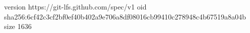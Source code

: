 version https://git-lfs.github.com/spec/v1
oid sha256:6cf42c3cf2bf0ef40b402a9e706a8df08016cb99410c278948c4b67519a8a04b
size 1636
